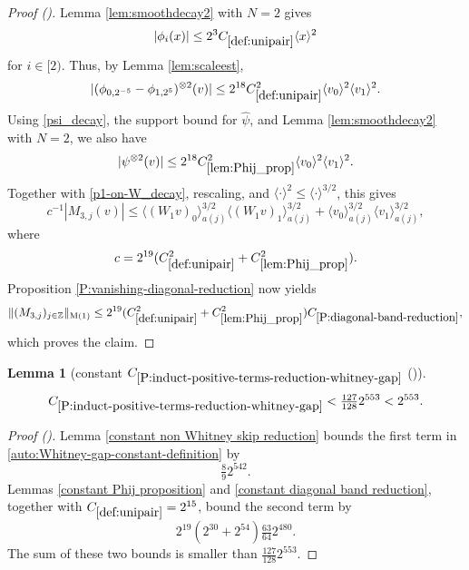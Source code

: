 \documentclass[12pt,reqno]{amsart}
\newcommand{\auto}{{({\tiny\faCar})}}
\theoremstyle{plain}
\newtheorem{lemma}[theorem]{Lemma}
\numberwithin{equation}{section}
\theoremstyle{remark}
\newcommand{\uses}[1]{}
\newcommand{\usesdefs}[1]{}
\newcommand{\Z}{{\mathbb Z}}
\begin{document}
\begin{proof}[Proof \auto]
Lemma \ref{lem:smoothdecay2} with $N=2$ gives
\[
|\phi_i(x)|\le2^3C_{\ref{def:unipair}}\langle x\rangle^2
\]
for $i\in[2)$. Thus, by Lemma \ref{lem:scaleest},
\[
|(\phi_{0,2^{-5}}-\phi_{1,2^5})^{\otimes2}(v)|
\le2^{18}C_{\ref{def:unipair}}^2\langle v_0\rangle^2\langle v_1\rangle^2.
\]
Using \eqref{psi_decay}, the support bound for $\widehat\psi$, and Lemma \ref{lem:smoothdecay2} with $N=2$, we also have
\begin{equation}\label{decay_2}
|\psi^{\otimes2}(v)|
\le2^{18}C_{\ref{lem:Phij_prop}}^2
\langle v_0\rangle^2\langle v_1\rangle^2.
\end{equation}
Together with \eqref{p1-on-W_decay}, rescaling, and $\langle\cdot\rangle^2\le\langle\cdot\rangle^{3/2}$, this gives
\[
c^{-1}|M_{3,j}(v)|
\le
\langle(W_1v)_0\rangle_{a(j)}^{3/2}
\langle(W_1v)_1\rangle_{a(j)}^{3/2}
+
\langle v_0\rangle_{a(j)}^{3/2}
\langle v_1\rangle_{a(j)}^{3/2},
\]
where
\[
c=2^{19}(C_{\ref{def:unipair}}^2+C_{\ref{lem:Phij_prop}}^2).
\]
Proposition \ref{P:vanishing-diagonal-reduction} now yields
\[
\|(M_{3,j})_{j\in\Z}\|_{\rm M(1)}
\le2^{19}(C_{\ref{def:unipair}}^2+C_{\ref{lem:Phij_prop}}^2)
C_{\ref{P:diagonal-band-reduction}},
\]
which proves the claim.
\end{proof}

\begin{lemma}[constant $C_{\ref{P:induct-positive-terms-reduction-whitney-gap}}$ \auto]\label{constant Whitney gap reduction}\uses{constant non Whitney skip reduction,P:induct-positive-terms-reduction-whitney-gap,constant Phij proposition,constant diagonal band reduction}\usesdefs{def:unipair}
\begin{equation}\label{constant Whitney gap reduction bound}
C_{\ref{P:induct-positive-terms-reduction-whitney-gap}}
<\tfrac{127}{128}2^{553}<2^{553}.
\end{equation}
\end{lemma}
\begin{proof}[Proof \auto]
Lemma \ref{constant non Whitney skip reduction} bounds the first term in \eqref{auto:Whitney-gap-constant-definition} by
\[
\tfrac89 2^{542}.
\]
Lemmas \ref{constant Phij proposition} and \ref{constant diagonal band reduction}, together with $C_{\ref{def:unipair}}=2^{15}$, bound the second term by
\[
2^{19}(2^{30}+2^{54})\tfrac{63}{64}2^{480}.
\]
The sum of these two bounds is smaller than $\frac{127}{128}2^{553}$.
\end{proof}
\end{document}
